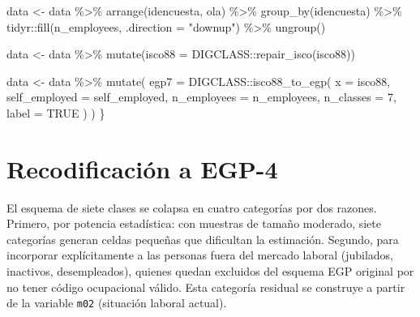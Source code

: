 \documentclass[
  spanish,
  a4paper,
  oneside]{scrbook}
\newenvironment{Shaded}{\begin{snugshade}}{\end{snugshade}}
\newcommand{\AttributeTok}[1]{\textcolor[rgb]{0.40,0.45,0.13}{#1}}
\newcommand{\ConstantTok}[1]{\textcolor[rgb]{0.56,0.35,0.01}{#1}}
\newcommand{\DecValTok}[1]{\textcolor[rgb]{0.68,0.00,0.00}{#1}}
\newcommand{\FunctionTok}[1]{\textcolor[rgb]{0.28,0.35,0.67}{#1}}
\newcommand{\NormalTok}[1]{\textcolor[rgb]{0.00,0.23,0.31}{#1}}
\newcommand{\OtherTok}[1]{\textcolor[rgb]{0.00,0.23,0.31}{#1}}
\newcommand{\SpecialCharTok}[1]{\textcolor[rgb]{0.37,0.37,0.37}{#1}}
\newcommand{\StringTok}[1]{\textcolor[rgb]{0.13,0.47,0.30}{#1}}
\begin{document}
\begin{Shaded}
\begin{Highlighting}[]
\NormalTok{  data }\OtherTok{\textless{}{-}}\NormalTok{ data }\SpecialCharTok{\%\textgreater{}\%}
    \FunctionTok{arrange}\NormalTok{(idencuesta, ola) }\SpecialCharTok{\%\textgreater{}\%}
    \FunctionTok{group\_by}\NormalTok{(idencuesta) }\SpecialCharTok{\%\textgreater{}\%}
\NormalTok{    tidyr}\SpecialCharTok{::}\FunctionTok{fill}\NormalTok{(n\_employees, }\AttributeTok{.direction =} \StringTok{"downup"}\NormalTok{) }\SpecialCharTok{\%\textgreater{}\%}
    \FunctionTok{ungroup}\NormalTok{()}

\NormalTok{  data }\OtherTok{\textless{}{-}}\NormalTok{ data }\SpecialCharTok{\%\textgreater{}\%}
    \FunctionTok{mutate}\NormalTok{(}\AttributeTok{isco88 =}\NormalTok{ DIGCLASS}\SpecialCharTok{::}\FunctionTok{repair\_isco}\NormalTok{(isco88))}

\NormalTok{  data }\OtherTok{\textless{}{-}}\NormalTok{ data }\SpecialCharTok{\%\textgreater{}\%}
    \FunctionTok{mutate}\NormalTok{(}
      \AttributeTok{egp7 =}\NormalTok{ DIGCLASS}\SpecialCharTok{::}\FunctionTok{isco88\_to\_egp}\NormalTok{(}
        \AttributeTok{x =}\NormalTok{ isco88,}
        \AttributeTok{self\_employed =}\NormalTok{ self\_employed,}
        \AttributeTok{n\_employees =}\NormalTok{ n\_employees,}
        \AttributeTok{n\_classes =} \DecValTok{7}\NormalTok{,}
        \AttributeTok{label =} \ConstantTok{TRUE}
\NormalTok{      )}
\NormalTok{    )}
\NormalTok{\}}
\end{Highlighting}
\end{Shaded}

\section{Recodificación a EGP-4}\label{recodificaciuxf3n-a-egp-4}

El esquema de siete clases se colapsa en cuatro categorías por dos
razones. Primero, por potencia estadística: con muestras de tamaño
moderado, siete categorías generan celdas pequeñas que dificultan la
estimación. Segundo, para incorporar explícitamente a las personas fuera
del mercado laboral (jubilados, inactivos, desempleados), quienes quedan
excluidos del esquema EGP original por no tener código ocupacional
válido. Esta categoría residual se construye a partir de la variable
\texttt{m02} (situación laboral actual).
\end{document}
